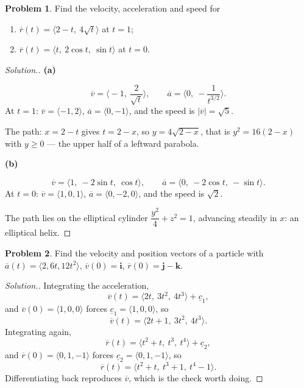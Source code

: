 \documentclass[11pt,a4paper]{article}
\theoremstyle{definition}
\newtheorem{problemx}{Problem}[subsection]
\newenvironment{problem}{\begin{problemx}}{\end{problemx}}
\newenvironment{solution}
  {\renewcommand{\qedsymbol}{}\begin{proof}[\textit{Solution}.]}
  {\end{proof}}
\newcommand{\subhead}[1]{%
  \par\medskip\noindent\textbf{#1}\par\nobreak\smallskip}
\begin{document}
\begin{problem}
Find the velocity, acceleration and speed for
\begin{enumerate}
\item[(a)] $\overline{r}(t) = \langle 2-t,\ 4\sqrt t\rangle$ at $t=1$;
\item[(b)] $\overline{r}(t) = \langle t,\ 2\cos t,\ \sin t\rangle$ at $t=0$.
\end{enumerate}
\end{problem}
\begin{solution}
\subhead{(a)}
$$\overline{v} = \Big\langle -1,\ \frac{2}{\sqrt t}\Big\rangle,\qquad
\overline{a} = \Big\langle 0,\ -\frac{1}{t^{3/2}}\Big\rangle .$$
At $t=1$: $\overline{v} = \langle -1,2\rangle$,
$\overline{a} = \langle 0,-1\rangle$, and the speed is
$\left|\overline{v}\right| = \sqrt5$.

The path: $x = 2-t$ gives $t = 2-x$, so $y = 4\sqrt{2-x}$, that is
$y^2 = 16(2-x)$ with $y\geq 0$ --- the upper half of a leftward parabola.

\subhead{(b)}
$$\overline{v} = \langle 1,\ -2\sin t,\ \cos t\rangle,\qquad
\overline{a} = \langle 0,\ -2\cos t,\ -\sin t\rangle .$$
At $t=0$: $\overline{v} = \langle 1,0,1\rangle$,
$\overline{a} = \langle 0,-2,0\rangle$, and the speed is $\sqrt2$.

The path lies on the elliptical cylinder
$\dfrac{y^2}{4} + z^2 = 1$, advancing steadily in $x$: an elliptical helix.
\end{solution}

\begin{problem}
Find the velocity and position vectors of a particle with
$\overline{a}(t) = \langle 2, 6t, 12t^2\rangle$,
$\overline{v}(0) = \textbf{i}$, $\overline{r}(0) = \textbf{j}-\textbf{k}$.
\end{problem}
\begin{solution}
Integrating the acceleration,
$$\overline{v}(t) = \langle 2t,\ 3t^2,\ 4t^3\rangle + \underline{c}_1 ,$$
and $\overline{v}(0) = \langle 1,0,0\rangle$ forces
$\underline{c}_1 = \langle 1,0,0\rangle$, so
$$\overline{v}(t) = \langle 2t+1,\ 3t^2,\ 4t^3\rangle .$$
Integrating again,
$$\overline{r}(t) = \langle t^2+t,\ t^3,\ t^4\rangle + \underline{c}_2 ,$$
and $\overline{r}(0) = \langle 0,1,-1\rangle$ forces
$\underline{c}_2 = \langle 0,1,-1\rangle$, so
$$\overline{r}(t) = \langle t^2+t,\ t^3+1,\ t^4-1\rangle .$$
Differentiating back reproduces $\overline{v}$, which is the check worth doing.
\end{solution}
\end{document}
